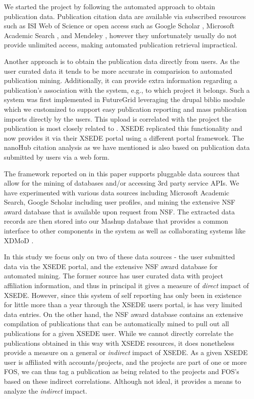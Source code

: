 \documentclass{sig-alternate}
\begin{document}
We started the project by following the automated approach to obtain publication data. Publication citation data are available via subscribed resources such as ISI Web of Science \cite{www-isiwos} or open access such as Google Scholar \cite{www-googlescholar}, Microsoft Academic Search \cite{www-msas}, and Mendeley \cite{www-mendeley}, however they unfortunately usually do not provide unlimited access, making automated publication retrieval impractical. 
 
Another approach is to obtain the publication data directly from users. As the user curated data it tends to be more accurate in comparision to automated publication mining. Additionally, it can provide extra information regarding a publication's association with the system, e.g., to which project it belongs. 
Such a system was first implemented in FutureGrid leveraging the drupal biblio module \cite{www-drupal-bib} which we customized to support easy publication reporting and mass publication imports directly by the users. This upload is correlated with the project the publication is most closely related to \cite{www-fgbiblio}. XSEDE replicated this functionality and now provides it via their XSEDE portal \cite{www-xdportalpub} using a different portal framework. The nanoHub citation analysis \cite{www-nanohubcite} as we have mentioned is also based on publication data submitted by users via a web form. 
 
The framework reported on in this paper supports pluggable data sources that allow for the mining of databases and/or accessing 3rd party service APIs. We have experimented with various data sources including Microsoft Academic Search, Google Scholar including user profiles, and mining the extensive NSF award database that is available upon request from NSF. The extracted data records are then stored into our Mashup database that provides a common interface to other components in the system as well as collaborating systems like XDMoD \cite{CPE:CPE2871}. 
 
In this study we focus only on two of these data sources - the user submitted data via the XSEDE portal, and the extensive NSF award database for automated mining. The former source has user curated data with project affiliation information, and thus in principal it gives a measure of \emph{direct} impact of XSEDE. However, since this system of self reporting has only been in existence for little more than a year through the XSEDE users portal, is has very limited data entries.  On the other hand, the NSF award database contains an extensive compilation of publications that can be automatically mined to pull out all publications for a given XSEDE user.   While we cannot directly correlate the publications obtained in this way with XSEDE resources, it does nonetheless provide a measure on a general or \emph{indirect} impact of XSEDE.   As a given XSEDE user is affiliated with accounts/projects, and the projects are part of one or more FOS, we can thus tag a publication as being related to the projects and FOS's based on these indirect correlations. Although not ideal, it provides a means to analyze the \emph{indirect} impact. 
 
\end{document}
